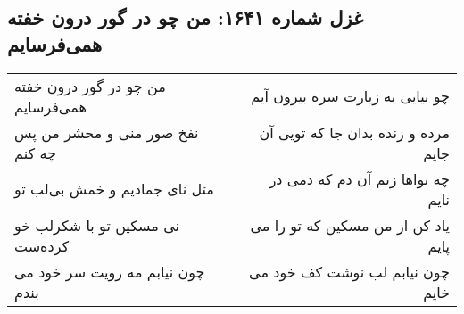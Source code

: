 \begin{center}
\section*{غزل شماره ۱۶۴۱: من چو در گور درون خفته همی‌فرسایم}
\label{sec:1641}
\begin{longtable}{l p{0.5cm} r}
من چو در گور درون خفته همی‌فرسایم
&&
چو بیایی به زیارت سره بیرون آیم
\\
نفخ صور منی و محشر من پس چه کنم
&&
مرده و زنده بدان جا که تویی آن جایم
\\
مثل نای جمادیم و خمش بی‌لب تو
&&
چه نواها زنم آن دم که دمی در نایم
\\
نی مسکین تو با شکرلب خو کرده‌ست
&&
یاد کن از من مسکین که تو را می پایم
\\
چون نیابم مه رویت سر خود می بندم
&&
چون نیابم لب نوشت کف خود می خایم
\\
\end{longtable}
\end{center}
